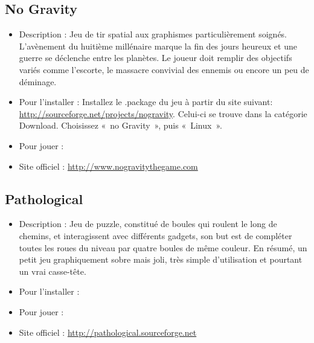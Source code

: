 \subsection{No Gravity}
\begin{itemize}
\begingroup
{}
\item Description : Jeu de tir spatial aux graphismes particulièrement soignés. L'avènement du huitième millénaire marque la fin des jours heureux et une guerre se déclenche entre les planètes. Le joueur doit remplir des objectifs variés comme l'escorte, le massacre convivial des ennemis ou encore un peu de déminage.{\par}
\endgroup
\item Pour l'installer : Installez le .package du jeu à partir du site suivant: \url{http://sourceforge.net/projects/nogravity}. Celui-ci se trouve dans la catégorie Download. Choisissez «~no Gravity~», puis «~Linux~».{\par}
\item Pour jouer : 
\item Site officiel : \url{http://www.nogravitythegame.com}{\par}
\end{itemize}

\subsection{Pathological}
\begin{itemize}
\begingroup
{}
\item Description : Jeu de puzzle, constitué de boules qui roulent le long de chemins, et interagissent avec différents gadgets, son but est de compléter toutes les roues du niveau par quatre boules de même couleur. En résumé, un petit jeu graphiquement sobre mais joli, très simple d'utilisation et pourtant un vrai casse-tête.{\par}
\endgroup
\item Pour l'installer : 
\item Pour jouer : 
\item Site officiel : \url{http://pathological.sourceforge.net}{\par}
\end{itemize}
